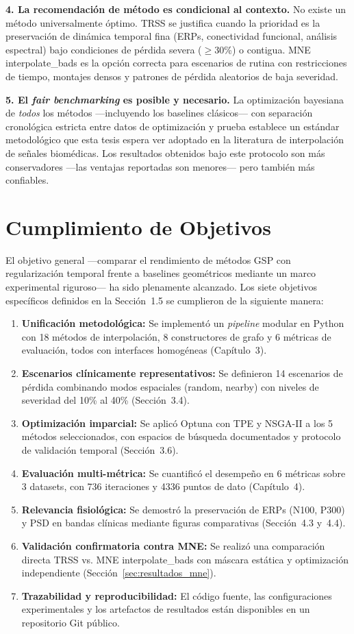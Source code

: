 \textbf{4. La recomendación de método es condicional al contexto.} No existe un método universalmente óptimo. TRSS se justifica cuando la prioridad es la preservación de dinámica temporal fina (ERPs, conectividad funcional, análisis espectral) bajo condiciones de pérdida severa ($\geq$30\%) o contigua. MNE interpolate\_bads es la opción correcta para escenarios de rutina con restricciones de tiempo, montajes densos y patrones de pérdida aleatorios de baja severidad.

\textbf{5. El \textit{fair benchmarking} es posible y necesario.} La optimización bayesiana de \textit{todos} los métodos —incluyendo los baselines clásicos— con separación cronológica estricta entre datos de optimización y prueba establece un estándar metodológico que esta tesis espera ver adoptado en la literatura de interpolación de señales biomédicas. Los resultados obtenidos bajo este protocolo son más conservadores —las ventajas reportadas son menores— pero también más confiables.

\section{Cumplimiento de Objetivos}

El objetivo general —comparar el rendimiento de métodos GSP con regularización temporal frente a baselines geométricos mediante un marco experimental riguroso— ha sido plenamente alcanzado. Los siete objetivos específicos definidos en la Sección~1.5 se cumplieron de la siguiente manera:

\begin{enumerate}
    \item \textbf{Unificación metodológica:} Se implementó un \textit{pipeline} modular en Python con 18 métodos de interpolación, 8 constructores de grafo y 6 métricas de evaluación, todos con interfaces homogéneas (Capítulo~3).
    \item \textbf{Escenarios clínicamente representativos:} Se definieron 14 escenarios de pérdida combinando modos espaciales (random, nearby) con niveles de severidad del 10\% al 40\% (Sección~3.4).
    \item \textbf{Optimización imparcial:} Se aplicó Optuna con TPE y NSGA-II a los 5 métodos seleccionados, con espacios de búsqueda documentados y protocolo de validación temporal (Sección~3.6).
    \item \textbf{Evaluación multi-métrica:} Se cuantificó el desempeño en 6 métricas sobre 3 datasets, con 736 iteraciones y 4336 puntos de dato (Capítulo~4).
    \item \textbf{Relevancia fisiológica:} Se demostró la preservación de ERPs (N100, P300) y PSD en bandas clínicas mediante figuras comparativas (Sección~4.3 y~4.4).
    \item \textbf{Validación confirmatoria contra MNE:} Se realizó una comparación directa TRSS vs. MNE interpolate\_bads con máscara estática y optimización independiente (Sección~\ref{sec:resultados_mne}).
    \item \textbf{Trazabilidad y reproducibilidad:} El código fuente, las configuraciones experimentales y los artefactos de resultados están disponibles en un repositorio Git público.
\end{enumerate}

